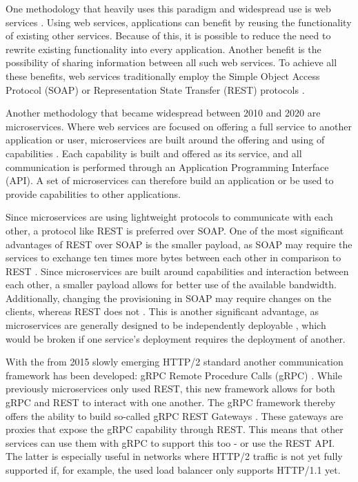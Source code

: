 \documentclass[conference]{IEEEtran}
\begin{document}
One methodology that heavily uses this paradigm and widespread use is web services \cite{halili2018web}. Using web services, applications can benefit by reusing the functionality of existing other services. Because of this, it is possible to reduce the need to rewrite existing functionality into every application. Another benefit is the possibility of sharing information between all such web services. To achieve all these benefits, web services traditionally employ the Simple Object Access Protocol (SOAP) or Representation State Transfer (REST) protocols \cite{halili2018web}.

Another methodology that became widespread between 2010 and 2020 are microservices. Where web services are focused on offering a full service to another application or user, microservices are built around the offering and using of capabilities \cite{karmel2016nist}. Each capability is built and offered as its service, and all communication is performed through an Application Programming Interface (API). A set of microservices can therefore build an application or be used to provide capabilities to other applications.


Since microservices are using lightweight protocols \cite{karmel2016nist} to communicate with each other, a protocol like REST is preferred over SOAP. One of the most significant advantages of REST over SOAP is the smaller payload, as SOAP may require the services to exchange ten times more bytes between each other in comparison to REST \cite{halili2018web}. Since microservices are built around capabilities and interaction between each other, a smaller payload allows for better use of the available bandwidth.
Additionally, changing the provisioning in SOAP may require changes on the clients, whereas REST does not \cite{halili2018web}. This is another significant advantage, as microservices are generally designed to be independently deployable \cite{karmel2016nist}, which would be broken if one service's deployment requires the deployment of another.

With the from 2015 slowly emerging HTTP/2 standard \cite{rfc7540} another communication framework has been developed: gRPC Remote Procedure Calls (gRPC) \cite{GRPCAuthors2020}. While previously microservices only used REST, this new framework allows for both gRPC and REST to interact with one another. The gRPC framework thereby offers the ability to build so-called gRPC REST Gateways \cite{grpcrest}. These gateways are proxies that expose the gRPC capability through REST. This means that other services can use them with gRPC to support this too - or use the REST API. The latter is especially useful in networks where HTTP/2 traffic is not yet fully supported if, for example, the used load balancer only supports HTTP/1.1 yet.
\end{document}
